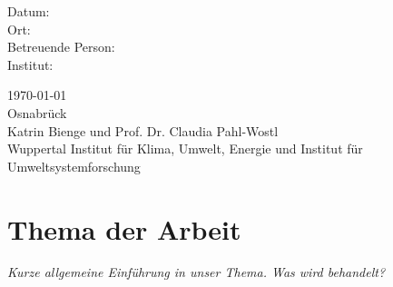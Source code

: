 \documentclass[11pt, titlepage=true]{scrartcl} %
\newcommand{\was}[1]{\small\textit{#1}}
\newcommand{\betreuung}{Katrin Bienge und Prof. Dr. Claudia Pahl-Wostl}
\newcommand{\institut}{Wuppertal Institut für Klima, Umwelt, Energie und Institut für Umweltsystemforschung}
\newcommand{\ort}{Osnabrück}
\begin{document}
\begin{titlepage}
\begin{center}
      \vfill
{}
      \begin{minipage}[t]{0.45\textwidth}
        \begin{flushright}
          Datum:              \\[1.2ex]
          Ort:                \\[1.2ex]
          Betreuende Person:  \\[1.2ex]
          Institut:           \\[3ex]
        \end{flushright}
      \end{minipage}
      \hspace{0.01\textwidth}
      \begin{minipage}[t]{0.45\textwidth}
        \begin{flushleft}
          \today\\[1.2ex]
          \ort\\[1.2ex]
          \betreuung\\[1.2ex]
          \institut \\[3ex]
        \end{flushleft}
      \end{minipage}
  \end{center}
\end{titlepage}
\tableofcontents
\section{Thema der Arbeit}
\was{Kurze allgemeine Einführung in unser Thema. Was wird behandelt?}
\end{document}
